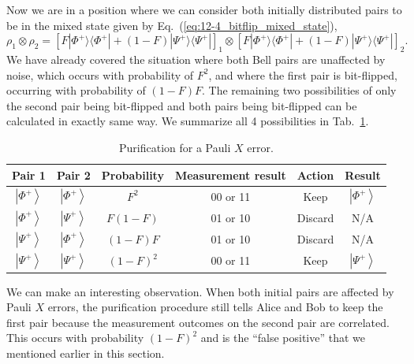 Now we are in a position where we can consider both initially distributed pairs to be in the mixed state given by Eq.~(\ref{eq:12-4_bitflip_mixed_state}),
\begin{equation}
    \rho_1 \otimes \rho_2 = \left[ F |\Phi^+\rangle \langle\Phi^+| + (1 - F) |\Psi^+\rangle \langle\Psi^+| \right]_1 \otimes \left[ F |\Phi^+\rangle \langle\Phi^+| + (1 - F) |\Psi^+\rangle \langle\Psi^+| \right]_2.
\end{equation}
We have already covered the situation where both Bell pairs are unaffected by noise, which occurs with probability of $F^2$, and where the first pair is bit-flipped, occurring with probability of $(1-F)F$.
The remaining two possibilities of only the second pair being bit-flipped and both pairs being bit-flipped can be calculated in exactly same way.
We summarize all 4 possibilities in Tab.~\ref{tab:12-4_purification_X_error}.
\begin{table}[t]
    \setcellgapes{3pt}
    \renewcommand\theadfont{}
    \makegapedcells
    \centering
    \begin{tabular}{cccccc}
        \hline
        \textbf{Pair 1} & \textbf{Pair 2} & \textbf{Probability} & \textbf{Measurement result} & \textbf{Action} & \textbf{Result} \\
        \hline
        $\left|\Phi^{+}\right\rangle$ & $\left|\Phi^{+}\right\rangle$ & $F^{2}$ & 00 or 11 & Keep & $\left|\Phi^{+}\right\rangle$ \\
        $\left|\Phi^{+}\right\rangle$ & $\left|\Psi^{+}\right\rangle$ & $F(1-F)$ & 01 or 10 & Discard & N/A \\
        $\left|\Psi^{+}\right\rangle$ & $\left|\Phi^{+}\right\rangle$ & $(1-F) F$ & 01 or 10 & Discard & N/A \\
        $\left|\Psi^{+}\right\rangle$ & $\left|\Psi^{+}\right\rangle$ & $(1-F)^{2}$ & 00 or 11 & Keep & $\left|\Psi^{+}\right\rangle$ \\
        \hline
    \end{tabular}
    \caption[X error purification.]{Purification for a Pauli $X$ error.}
    \label{tab:12-4_purification_X_error}
\end{table}

We can make an interesting observation.
When both initial pairs are affected by Pauli $X$ errors, the purification procedure still tells Alice and Bob to keep the first pair because the measurement outcomes on the second pair are correlated.
This occurs with probability $(1-F)^2$ and is the ``false positive'' that we mentioned earlier in this section.

